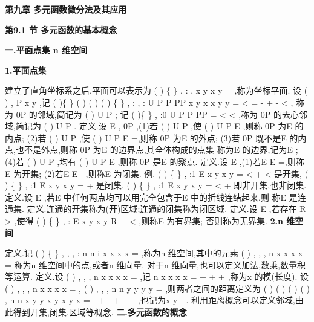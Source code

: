\begin{center}
{\Large \bfseries \textcolor{lyred}{第九章 多元函数微分法及其应用}}
\end{center}

\vspace{6pt}
{\large \bfseries \textcolor{lyred}{第9.1 节 多元函数的基本概念}}

\vspace{4pt}
{\bfseries \textcolor{lyred}{一.平面点集 n 维空间}}

{\bfseries \textcolor{lyred}{1.平面点集}}

建立了直角坐标系之后,平面可以表示为
(
)
\{
\}
,
: ,
x y
x y
=
\in 
{}
,称为\textcolor{lyred}{坐标平面}. 
设
(
)
,
P x
y
\in {},记
(
)\{
\}
(
)
(
)
(
)
\{
\}
,
:
,
:
U P
P PP
x y
x
x
y
y
\delta 
\delta 
\delta 
=
<
=
-
+
-
<
, 
称为
0P 的\delta \textcolor{lyred}{邻域},简记为
(
)
U P ; 
记
(
)\{
\}
,
:0
U P
P
PP
\delta 
\delta 
=
<
<
\circ 
,称为
0P 的\textcolor{lyred}{去心}\delta \textcolor{lyred}{邻域},简记为
(
)
U P
\circ 
. 
\textcolor{lyred}{定义}.设
E \subset {},
0P \in {},(1)若
(
)
U P
\exists 
,使
(
)
U P
E
\subset 
,则称
0P 为E 的\textcolor{lyred}{内点}; 
(2)若
(
)
U P
\exists 
,使
(
)
U P
E
\cap 
=\emptyset ,则称
0P 为E 的\textcolor{lyred}{外点}; 
(3)若
0P 既不是E 的内点,也不是外点,则称
0P 为E 的\textcolor{lyred}{边界点},其全体构成的点集 
称为E 的\textcolor{lyred}{边界},记为E
\partial ; 
(4)若
(
)
U P
\forall 
\circ 
,均有
(
)
U P
E
\cap 
\neq \emptyset 
\circ 
,则称
0P 是E 的\textcolor{lyred}{聚点}. 
\textcolor{lyred}{定义}.设
E \subset {},(1)若E
E
\cap \partial 
=\emptyset ,则称E 为\textcolor{lyred}{开集}; 
(2)若E
E
\partial 
,则称E 为\textcolor{lyred}{闭集}. 
\textcolor{lyred}{例}.
(
)
\{
\}
,
:1
E
x y
x
y
=
<
+
<
是开集,
(
)
\{
\}
,
:1
E
x y
x
y
=
\le 
+
\le 
是闭集, 
(
)
\{
\}
,
:1
E
x y
x
y
=
<
+
\le 
即非开集,也非闭集. 
\textcolor{lyred}{定义}.设
E \subset {},若E 中任何两点均可以用完全包含于E 中的折线连结起来,则 
称E 是\textcolor{lyred}{连通集}. 
\textcolor{lyred}{定义}.连通的开集称为\textcolor{lyred}{(开)区域};连通的闭集称为\textcolor{lyred}{闭区域}. 
\textcolor{lyred}{定义}.设
E \subset {},若存在
R >
,使得
(
)
\{
\}
,
:
E
x y
x
y
R
\subset 
+
<
,则称E 为\textcolor{lyred}{有界集}; 
否则称为\textcolor{lyred}{无界集}. 
{\bfseries \textcolor{lyred}{2.n 维空间}}

\textcolor{lyred}{定义}.记
(
)
\{
\}
,
,
,
:
n
n
i
x x
x
x
=
\in 
\Lambda 
{}
,称为\textcolor{lyred}{n 维空间},其中的元素
(
)
,
,
,
n
x
x x
x
=
\Lambda 
称为n 维空间中的\textcolor{lyred}{点},或者\textcolor{lyred}{n 维向量}. 
对于n 维向量,也可以定义加法,数乘,数量积等运算. 
\textcolor{lyred}{定义}.设
(
)
,
,
,
n
x
x x
x
=
\Lambda 
,记
n
x
x
x
x
=
+
+
+
\Lambda 
,称为x 的\textcolor{lyred}{模}(长度). 
设
(
)
,
,
,
n
x
x x
x
=
\Lambda 
,
(
)
,
,
,
n
n
y
y y
y
=
\in 
\Lambda 
{},则两者之间的\textcolor{lyred}{距离}定义为 
(
)
(
)
(
)
(
)
,
n
n
x y
y
x
y
x
y
x
\rho 
=
-
+
-
+
+
-
\Lambda 
,也记为x
y
-
. 
利用距离概念可以定义邻域,由此得到开集,闭集,区域等概念. 
\vspace{4pt}
{\bfseries \textcolor{lyred}{二.多元函数的概念}}

